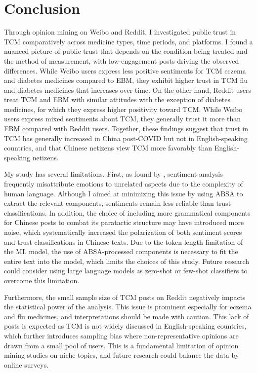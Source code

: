 \documentclass[11pt]{article}
\begin{document}
\section{Conclusion}

Through opinion mining on Weibo and Reddit, I investigated public trust in TCM comparatively across medicine types, time periods, and platforms. I found a nuanced picture of public trust that depends on the condition being treated and the method of measurement, with low-engagement posts driving the observed differences. While Weibo users express less positive sentiments for TCM eczema and diabetes medicines compared to EBM, they exhibit higher trust in TCM flu and diabetes medicines that increases over time. On the other hand, Reddit users treat TCM and EBM with similar attitudes with the exception of diabetes medicines, for which they express higher positivity toward TCM. While Weibo users express mixed sentiments about TCM, they generally trust it more than EBM compared with Reddit users. Together, these findings suggest that trust in TCM has generally increased in China post-COVID but not in English-speaking countries, and that Chinese netizens view TCM more favorably than English-speaking netizens.

My study has several limitations. First, as found by \textcite{gao_2021_weibo}, sentiment analysis frequently misattribute emotions to unrelated aspects due to the complexity of human language. Although I aimed at minimizing this issue by using ABSA to extract the relevant components, sentiments remain less reliable than trust classifications. In addition, the choice of including more grammatical components for Chinese posts to combat its paratactic structure may have introduced more noise, which systematically increased the polarization of both sentiment scores and trust classifications in Chinese texts. Due to the token length limitation of the ML model, the use of ABSA-processed components is necessary to fit the entire text into the model, which limits the choices of this study. Future research could consider using large language models as zero-shot or few-shot classifiers to overcome this limitation.

Furthermore, the small sample size of TCM posts on Reddit negatively impacts the statistical power of the analysis. This issue is prominent especially for eczema and flu medicines, and interpretations should be made with caution. This lack of posts is expected as TCM is not widely discussed in English-speaking countries, which further introduces sampling bias where non-representative opinions are drawn from a small pool of users. This is a fundamental limitation of opinion mining studies on niche topics, and future research could balance the data by online surveys.
\end{document}
